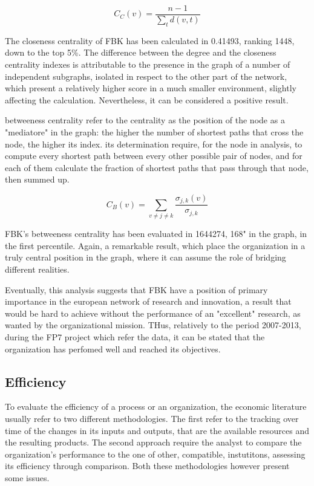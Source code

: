 \[
	C_C (v) =
		\frac 
			{n-1}
			{
				\sum_t d(v, t)
			} 
\]


The closeness centrality of FBK has been  calculated in 0.41493, ranking 1448, down to the top 5\%. The difference between the degree and the closeness centrality indexes is attributable to the presence in the graph of a number of independent subgraphs, isolated in respect to the other part of the network, which present a relatively higher score in a much smaller environment, slightly affecting the calculation. Nevertheless, it can be considered a positive result.  

betweeness centrality refer to the centrality as the position of the node as a "mediatore" in the graph: the higher the number of shortest paths that cross the node, the higher its index. its determination require, for the node in analysis, to compute every shortest path between every other possible pair of nodes, and for each of them calculate the fraction of shortest paths that pass through that node, then summed up. 

\[
	C_B (v) =
		\sum_{v \neq j \neq k}
			\frac {\sigma_{j,k} (v)}{\sigma_{j,k}}
\]

FBK's betweeness centrality has been evaluated in 1644274, 168" in the graph, in the first percentile. Again, a remarkable result, which place the organization in a truly central position in the graph, where it can assume the role of bridging different realities. 

Eventually, this analysis suggests that FBK have a position of primary importance in the european network of research and innovation, a result that would be hard to achieve without the performance of an "excellent" research, as wanted by the organizational mission. THus, relatively to the period 2007-2013, during the FP7 project which refer the data, it can be stated that the organization has perfomed well and reached its objectives. 

\subsection{Efficiency}

To evaluate the efficiency of a process or an organization, the economic literature usually refer to two different methodologies. The first refer to the tracking over time of the changes in its inputs and outputs, that are the available resources and the resulting products. The second approach require the analyst to compare the organization's performance to the one of other, compatible, instutitons, assessing its efficiency through comparison. Both these methodologies however present some issues.

